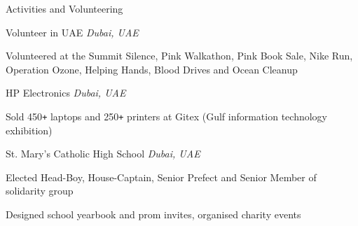 \documentclass{resume} %
\begin{document}
\begin{rSection}{Activities and Volunteering}
  \begin{rSubsection}{Volunteer in UAE}
                     {\em Dubai, UAE}
                     {}
                     {}
    \item Volunteered at the Summit Silence, Pink Walkathon, Pink Book Sale, Nike
	    Run, Operation Ozone, Helping Hands, Blood Drives and Ocean Cleanup
  \end{rSubsection}

  \begin{rSubsection}{HP Electronics}
                     {\em Dubai, UAE}
                     {}
                     {}
    \item Sold 450\texttt{+} laptops and 250\texttt{+} printers at
		     Gitex (Gulf information technology exhibition)
  \end{rSubsection}

  \begin{rSubsection}{St. Mary's Catholic High School}
                     {\em Dubai, UAE}
                     {}
                     {}
 
    \item Elected Head-Boy, House-Captain, Senior Prefect and Senior Member of solidarity
	  group
    \item Designed school yearbook and prom invites, organised charity
	  events
	  
  \end{rSubsection}
\end{rSection}
\end{document}
